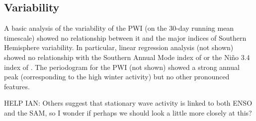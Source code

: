 \subsection{Variability}

A basic analysis of the variability of the PWI (on the 30-day running mean timescale) showed no relationship between it and the major indices of Southern Hemisphere variability. In particular, linear regression analysis (not shown) showed no relationship with the Southern Annual Mode index of \citet{Marshall2003} or the Ni\~{n}o 3.4 index of \citet{Trenberth2001}. The periodogram for the PWI (not shown) showed a strong annual peak (corresponding to the high winter activity) but no other pronounced features.

HELP IAN: Others \citep[like][]{Pezza2012} suggest that stationary wave activity is linked to both ENSO and the SAM, so I wonder if perhaps we should look a little more closely at this? 